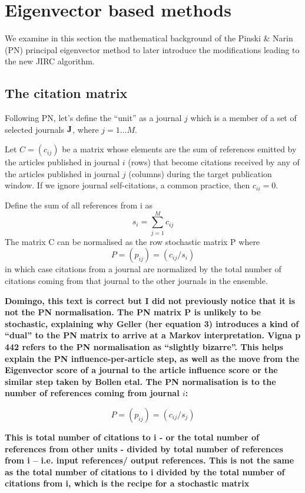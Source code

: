 \documentclass[10pt]{article}
\begin{document}
\section{Eigenvector based methods}
We examine in this section the mathematical background of the Pinski \& Narin (PN) principal eigenvector method to later introduce the modifications leading to the new JIRC algorithm.
\subsection{The citation matrix}
Following PN, let's define the ``unit'' as a journal $j$ which is a member of a set of selected
journals $\bf{J}$, where $j = 1 \ldots M$.

Let $C = (c_{ij})$ be a matrix whose elements are the sum of references emitted by
the articles published in journal $i$ (rows) that become citations received by any of the articles published in journal $j$ (columns) during the target
publication window. If we ignore journal self-citations, a common practice, then $c_{ii} = 0$.


\noindent Define the sum of all references from i as
\begin{equation}
s_i = \sum_{j=1}^Mc_{ij}
\end{equation}
The matrix C can be normalised as the row stochastic matrix P where
\begin{equation}
P = (p_{ij}) = (c_{ij}/s_i)
\end{equation}
in which case citations from a journal are normalized by the total number of citations coming from that journal to the other journals in the ensemble.

\textbf{Domingo, this text is correct but I did not previously notice that it is not the PN normalisation. The PN matrix P is unlikely to be stochastic, explaining why Geller (her equation 3) introduces a kind of ``dual'' to the PN matrix to arrive at a Markov interpretation. Vigna p 442 refers to the PN normalisation as ``slightly bizarre''. This helps explain the PN influence-per-article step, as well as the move from the Eigenvector score of a journal to the article influence score or the similar step taken by Bollen etal.  The PN normalisation is to the number of references coming from journal $i$:}

\begin{equation}
P = (p_{ij}) = (c_{ij}/s_j)
\end{equation}

\textbf{This is total number of citations to i - or the total number of references from other units -  divided by total number of references from i -- i.e. input references/ output references. This is not the same as the total number of citations to i divided by the total number of citations from i, which is the recipe for a stochastic matrix}
\end{document}
